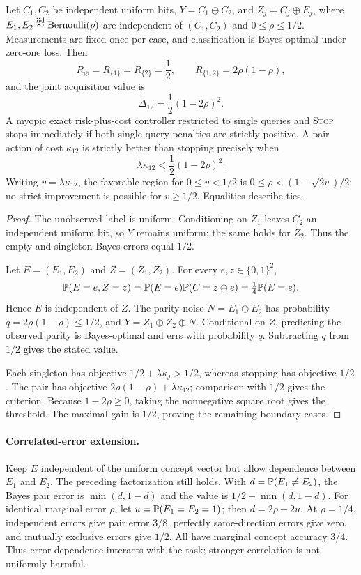 \begin{acamprop}
\label{prop:acam-xor}
Let $C_1,C_2$ be independent uniform bits, $Y=C_1\oplus C_2$, and
$Z_j=C_j\oplus E_j$, where
$E_1,E_2\stackrel{\rm iid}{\sim}\operatorname{Bernoulli}(\rho)$ are
independent of $(C_1,C_2)$ and $0\leq\rho\leq1/2$. Measurements are fixed
once per case, and classification is Bayes-optimal under zero-one loss.
Then
\[
 R_\varnothing=R_{\{1\}}=R_{\{2\}}=\frac12,\qquad
 R_{\{1,2\}}=2\rho(1-\rho),
\]
and the joint acquisition value is
\[
 \Delta_{12}=\frac12(1-2\rho)^2.
\]
A myopic exact risk-plus-cost controller restricted to single queries
and \textnormal{\textsc{Stop}} stops immediately if both single-query penalties are
strictly positive. A pair action of cost $\kappa_{12}$ is strictly better
than stopping precisely when
\[
 \lambda\kappa_{12}<\frac12(1-2\rho)^2.
\]
Writing $v=\lambda\kappa_{12}$, the favorable region for $0\leq v<1/2$ is
$0\leq\rho<(1-\sqrt{2v})/2$; no strict improvement is possible for
$v\geq1/2$. Equalities describe ties.
\end{acamprop}

\begin{proof}
The unobserved label is uniform. Conditioning on $Z_1$ leaves $C_2$ an
independent uniform bit, so $Y$ remains uniform; the same holds for
$Z_2$. Thus the empty and singleton Bayes errors equal $1/2$.

Let $E=(E_1,E_2)$ and $Z=(Z_1,Z_2)$. For every $e,z\in\{0,1\}^2$,
\[
 \mathbb{P}(E=e,Z=z)=\mathbb{P}(E=e)\mathbb{P}(C=z\oplus e)
 =\tfrac14\mathbb{P}(E=e).
\]
Hence $E$ is independent of $Z$. The parity noise
$N=E_1\oplus E_2$ has probability
$q=2\rho(1-\rho)\leq1/2$, and
$Y=Z_1\oplus Z_2\oplus N$. Conditional on $Z$, predicting the observed
parity is Bayes-optimal and errs with probability $q$. Subtracting $q$
from $1/2$ gives the stated value.

Each singleton has objective $1/2+\lambda\kappa_j>1/2$, whereas stopping
has objective $1/2$. The pair has objective
$2\rho(1-\rho)+\lambda\kappa_{12}$; comparison with $1/2$ gives the
criterion. Because $1-2\rho\geq0$, taking the nonnegative square root
gives the threshold. The maximal gain is $1/2$, proving the remaining
boundary cases.
\end{proof}

\paragraph{Correlated-error extension.}
Keep $E$ independent of the uniform concept vector but allow dependence
between $E_1$ and $E_2$. The preceding factorization still holds. With
$d=\mathbb{P}(E_1\neq E_2)$, the Bayes pair error is
$\min(d,1-d)$ and the value is $1/2-\min(d,1-d)$. For identical marginal
error $\rho$, let $u=\mathbb{P}(E_1=E_2=1)$; then $d=2\rho-2u$.
At $\rho=1/4$, independent errors give pair error $3/8$, perfectly
same-direction errors give zero, and mutually exclusive errors give
$1/2$. All have marginal concept accuracy $3/4$. Thus error dependence
interacts with the task; stronger correlation is not uniformly harmful.

